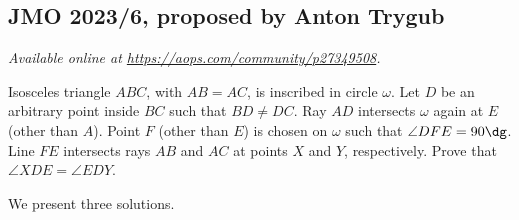 \documentclass[11pt]{scrartcl}
\begin{document}
\subsection{JMO 2023/6, proposed by Anton Trygub}
\textsl{Available online at \url{https://aops.com/community/p27349508}.}
\begin{mdframed}[style=mdpurplebox,frametitle={Problem statement}]
Isosceles triangle $ABC$, with $AB=AC$, is inscribed in circle $\omega$.
Let $D$ be an arbitrary point inside $BC$ such that $BD \neq DC$.
Ray $AD$ intersects $\omega$ again at $E$ (other than $A$).
Point $F$ (other than $E$) is chosen on $\omega$ such that $\angle DFE = 90\dg$.
Line $FE$ intersects rays $AB$ and $AC$ at points $X$ and $Y$, respectively.
Prove that $\angle XDE = \angle EDY$.
\end{mdframed}
We present three solutions.
\end{document}
